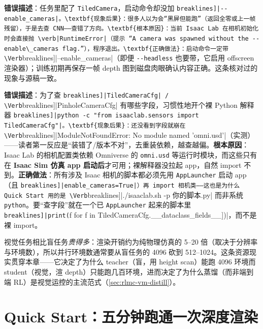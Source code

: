 \begin{pitfall}
\textbf{错误描述}：任务里配了 \verb|TiledCamera|，启动命令却没加 \Verb[breaklines]|--enable_cameras|。\textbf{现象后果}：很多人以为会“黑屏但能跑”（返回全零或上一帧残留），于是去查 CNN——查错了方向。\textbf{根本原因}：当前 Isaac Lab 在相机初始化时会直接抛 \verb|RuntimeError|（提示 “A camera was spawned without the --enable\_cameras flag.”），程序退出。\textbf{正确做法}：启动命令一定带 \Verb[breaklines]|--enable_cameras|（即便 \verb|--headless| 也要带，它启用 offscreen 渲染器）；训练初期再保存一帧 depth 图到磁盘肉眼确认内容正确。这条核对过的现象与源稿一致。
\end{pitfall}

\begin{pitfall}
\textbf{错误描述}：为了查 \Verb[breaklines]|TiledCameraCfg| / \Verb[breaklines]|PinholeCameraCfg| 有哪些字段，习惯性地开个裸 Python 解释器 \Verb[breaklines]|python -c "from isaaclab.sensors import TiledCameraCfg"|。\textbf{现象后果}：还没看到字段就崩在 \Verb[breaklines]|ModuleNotFoundError: No module named 'omni.usd'|（实测）——读者第一反应是“装错了/版本不对”，去重装依赖，越查越偏。\textbf{根本原因}：Isaac Lab 的相机配置类依赖 Omniverse 的 \verb|omni.usd| 等运行时模块，而这些只有在 \textbf{Isaac Sim 仿真 app 启动后}才可用；裸解释器没拉起 app，自然 import 不到。\textbf{正确做法}：所有涉及 Isaac 相机的脚本都必须先用 \verb|AppLauncher| 启动 app（且 \Verb[breaklines]|enable_cameras=True|）再 import 相机类——这也是为什么 Quick Start 用的是 \Verb[breaklines]|./isaaclab.sh -p 你的脚本.py| 而非系统 \verb|python|。要“查字段”就在一个已 \verb|AppLauncher| 起来的脚本里 \Verb[breaklines]|print([f for f in TiledCameraCfg.__dataclass_fields__])|，而不是裸 import。
\end{pitfall}

视觉任务相比盲任务\emph{贵得多}：渲染开销约为纯物理仿真的 5--20 倍（取决于分辨率与环境数），所以并行环境数通常要从盲任务的 4096 砍到 512--1024。这条资源现实贯穿本章——它决定了为什么 teacher（盲，用 height scan）能跑 4096 环境而 student（视觉，渲 depth）只能跑几百环境，进而决定了为什么蒸馏（而非端到端 RL）是视觉运控的主流范式（\cref{sec:rlmc-vm-distill}）。

\section{Quick Start：五分钟跑通一次深度渲染}
\label{sec:rlmc-vm-quickstart}

